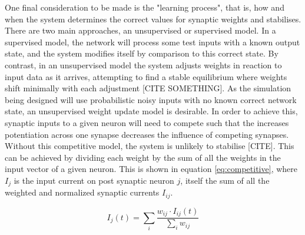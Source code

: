 One final consideration to be made is the "learning process", that is, how and
when the system determines the correct values for synaptic weights and
stabilises. There are two main approaches, an unsupervised or supervised model.
In a supervised model, the network will process some test inputs with a known
output state, and the system modifies itself by comparison to this correct
state. By contrast, in an unsupervised model the system adjusts weights in
reaction to input data as it arrives, attempting to find a stable equilibrium
where weights shift minimally with each adjustment [CITE SOMETHING]. As the
simulation being designed will use probabilistic noisy inputs with no known
correct network state, an unsupervised weight update model is desirable. In
order to achieve this, synaptic inputs to a given neuron will need to compete
such that the increases potentiation across one synapse decreases the influence
of competing synapses. Without this competitive model, the system is unlikely to
stabilise [CITE]. This can be achieved by dividing each weight by the sum of all
the weights in the input vector of a given neuron. This is shown in equation
\ref{eq:competitive}, where $I_j$ is the input current on post synaptic neuron
$j$, itself the sum of all the weighted and normalized synaptic currents
$I_{ij}$.

\begin{equation}
    \label{eq:competitive}
    I_j(t) = \sum_{i}\frac{w_{ij} \cdot I_{ij}(t)}{\sum_{i}w_{ij}}
\end{equation}


